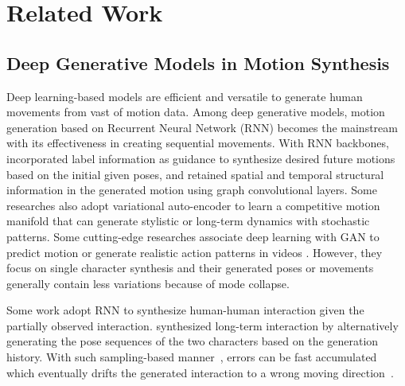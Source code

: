 \documentclass[times,twocolumn,final]{elsarticle}
\begin{document}
\section{Related Work}
\label{sec:related_work}
\subsection{Deep Generative Models in Motion Synthesis}
Deep learning-based models are efficient and versatile to generate human movements from vast of motion data. Among deep generative models, motion generation based on Recurrent Neural Network (RNN) becomes the mainstream with its effectiveness in creating sequential movements. With RNN backbones, \cite{battan2021glocalnet} incorporated label information as guidance to synthesize desired future motions based on the initial given poses, and \cite{yu2020structure} retained spatial and temporal structural information in the generated motion using graph convolutional layers. Some researches \cite{habibie2017recurrent,ghorbani2020probabilistic} also adopt variational auto-encoder to learn a competitive motion manifold that can generate stylistic or long-term dynamics with stochastic patterns. Some cutting-edge researches associate deep learning with GAN to predict motion \cite{barsoum2018hp,men2020quadruple} or generate realistic action patterns in videos \cite{yan2017skeleton}. However, they focus on single character synthesis and their generated poses or movements generally contain less variations because of mode collapse.

Some work \cite{kundu2020cross,baruah2020multimodal} adopt RNN to synthesize human-human interaction given the partially observed interaction. \cite{kundu2020cross} synthesized long-term interaction by alternatively generating the pose sequences of the two characters based on the generation history. With such sampling-based manner~\cite{martinez2017human}, errors can be fast accumulated which eventually drifts the generated interaction to a wrong moving direction~\cite{pavllo2018quaternet,pavllo2019modeling}.


\end{document}
